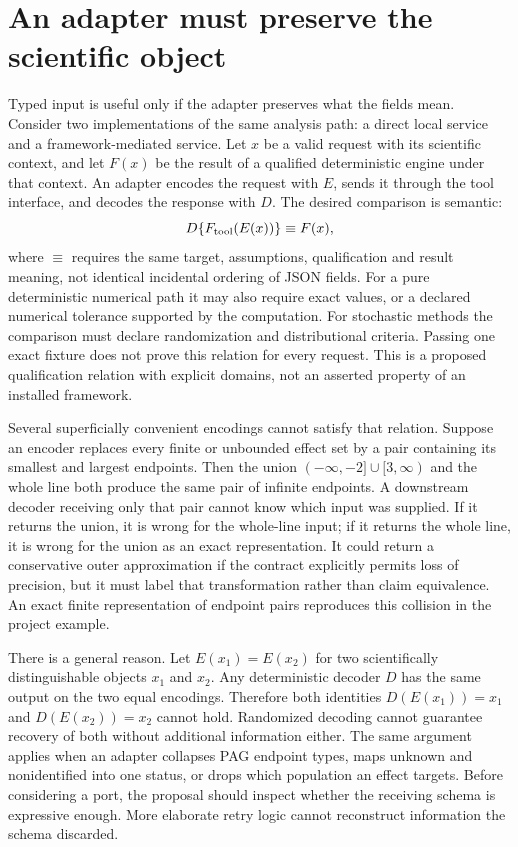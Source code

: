 \section{An adapter must preserve the scientific object}
\label{exec14:l6-adapter}

Typed input is useful only if the adapter preserves what the fields mean.
Consider two implementations of the same analysis path: a direct local
service and a framework-mediated service. Let $x$ be a valid request with
its scientific context, and let $F(x)$ be the result of a qualified
deterministic engine under that context. An adapter encodes the request
with $E$, sends it through the tool interface, and decodes the response
with $D$. The desired comparison is semantic:
\begin{equation}
 D\{F_{\rm tool}(E(x))\}\equiv F(x),
 \label{exec14:l6-commute}
\end{equation}
where $\equiv$ requires the same target, assumptions, qualification and
result meaning, not identical incidental ordering of JSON fields. For a
pure deterministic numerical path it may also require exact values, or a
declared numerical tolerance supported by the computation. For stochastic
methods the comparison must declare randomization and distributional
criteria. Passing one exact fixture does not prove this relation for every
request. This is a proposed qualification relation with explicit domains,
not an asserted property of an installed framework.
\citep{exec14_l6_adapter_exact}

Several superficially convenient encodings cannot satisfy that relation.
Suppose an encoder replaces every finite or unbounded effect set by a pair
containing its smallest and largest endpoints. Then the union
$(-\infty,-2]\cup[3,\infty)$ and the whole line both produce the same
pair of infinite endpoints. A downstream decoder receiving only that pair
cannot know which input was supplied. If it returns the union, it is wrong
for the whole-line input; if it returns the whole line, it is wrong for the
union as an exact representation. It could return a conservative outer
approximation if the contract explicitly permits loss of precision, but
it must label that transformation rather than claim equivalence. An exact
finite representation of endpoint pairs reproduces this collision in the
project example.

There is a general reason. Let $E(x_1)=E(x_2)$ for two scientifically
distinguishable objects $x_1$ and $x_2$. Any deterministic decoder $D$ has
the same output on the two equal encodings. Therefore both identities
$D(E(x_1))=x_1$ and $D(E(x_2))=x_2$ cannot hold. Randomized decoding cannot
guarantee recovery of both without additional information either. The
same argument applies when an adapter collapses PAG endpoint types, maps
unknown and nonidentified into one status, or drops which population an
effect targets. Before considering a port, the proposal should inspect
whether the receiving schema is expressive enough. More elaborate retry
logic cannot reconstruct information the schema discarded.
\citep{exec14_l6_adapter_exact}

